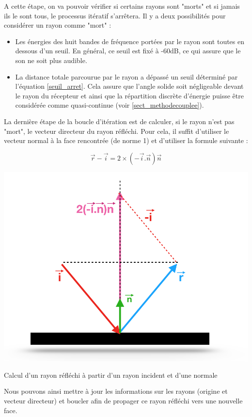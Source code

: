 A cette étape, on va pouvoir vérifier si certains rayons sont "morts" et si jamais ils le sont tous, le processus itératif s'arrêtera. Il y a deux possibilités pour considérer un rayon comme "mort" : 
\begin{itemize}
	\item Les énergies des huit bandes de fréquence portées par le rayon sont toutes en dessous d'un seuil. En général, ce seuil est fixé à -60dB, ce qui assure que le son ne soit plus audible.
	\item La distance totale parcourue par le rayon a dépassé un seuil déterminé par l'équation \ref{seuil_arret}. Cela assure que l'angle solide soit négligeable devant le rayon du récepteur et ainsi 	que la répartition discrète d'énergie puisse être considérée comme quasi-continue (voir \ref{sect_methodecouplee}).
\end{itemize}

La dernière étape de la boucle d'itération est de calculer, si le rayon n'est pas "mort", le vecteur directeur du rayon réfléchi. Pour cela, il suffit d'utiliser le vecteur normal à la face rencontrée (de norme 1) et d'utiliser la formule suivante :

\begin{equation}
\overrightarrow{r} - \overrightarrow{i} = 2 \times (-\overrightarrow{i}.\overrightarrow{n})\overrightarrow{n}
\end{equation}

\begin{figureth}
	\includegraphics[width=0.6\linewidth]{images/rayRefl}
	\caption{Calcul d'un rayon réfléchi à partir d'un rayon incident et d'une normale}
	\label{rayRefl}
\end{figureth}

Nous pouvons ainsi mettre à jour les informations sur les rayons (origine et vecteur directeur) et boucler afin de propager ce rayon réfléchi vers une nouvelle face.

